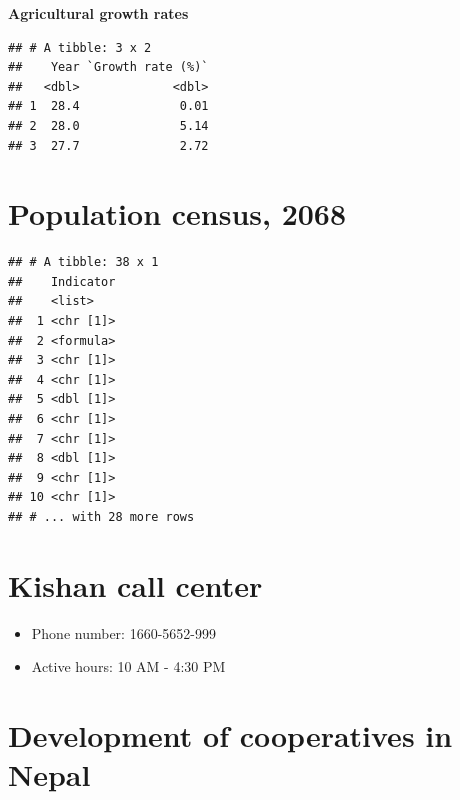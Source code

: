 \documentclass[
]{book}
\providecommand{\tightlist}{%
  \setlength{\itemsep}{0pt}\setlength{\parskip}{0pt}}
\begin{document}
\textbf{Agricultural growth rates}

\begin{verbatim}
## # A tibble: 3 x 2
##    Year `Growth rate (%)`
##   <dbl>             <dbl>
## 1  28.4              0.01
## 2  28.0              5.14
## 3  27.7              2.72
\end{verbatim}

\hypertarget{population-census-2068}{%
\section{Population census, 2068}\label{population-census-2068}}

\begin{verbatim}
## # A tibble: 38 x 1
##    Indicator
##    <list>   
##  1 <chr [1]>
##  2 <formula>
##  3 <chr [1]>
##  4 <chr [1]>
##  5 <dbl [1]>
##  6 <chr [1]>
##  7 <chr [1]>
##  8 <dbl [1]>
##  9 <chr [1]>
## 10 <chr [1]>
## # ... with 28 more rows
\end{verbatim}

\hypertarget{kishan-call-center}{%
\section{Kishan call center}\label{kishan-call-center}}

\begin{itemize}
\tightlist
\item
  Phone number: 1660-5652-999
\item
  Active hours: 10 AM - 4:30 PM
\end{itemize}

\hypertarget{development-of-cooperatives-in-nepal}{%
\section{Development of cooperatives in Nepal}\label{development-of-cooperatives-in-nepal}}
\end{document}
